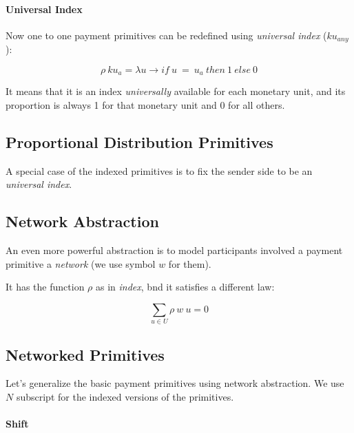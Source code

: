 \paragraph{Universal Index}

Now one to one payment primitives can be redefined using \textit{universal index} ($ku_{any}$):

\begin{equation}
    \rho\ ku_{a} = \lambda u \rightarrow if\ u\ =\ u_a\ then\ 1\ else\ 0
\end{equation}

It means that it is an index \textit{universally} available for each monetary unit, and its
proportion is always 1 for that monetary unit and 0 for all others.

\subsection{Proportional Distribution Primitives}

A special case of the indexed primitives is to fix the sender side to be an \textit{universal index}.

\subsection{Network Abstraction}

An even more powerful abstraction is to model participants involved a payment primitive
a \textit{network} (we use symbol $w$ for them).

It has the function $\rho$ as in \textit{index}, bnd it satisfies a different law:

\begin{equation}
    \displaystyle \sum_{u \in U} \rho\ w\ u = 0
\end{equation}

\subsection{Networked Primitives}

Let's generalize the basic payment primitives using network abstraction. We use $N$ subscript for
the indexed versions of the primitives.

\paragraph{Shift}

